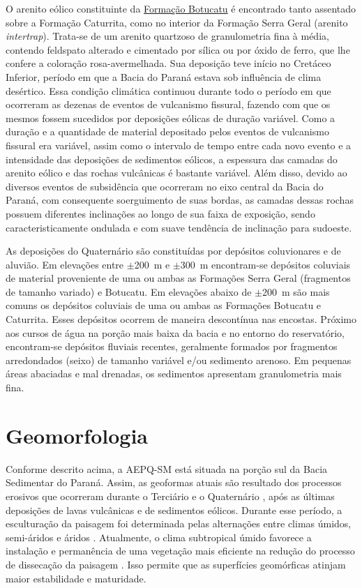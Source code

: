 O arenito eólico constituinte da \href{http://pt.wikipedia.org/wiki/Forma\%C3\%A7\%C3\%A3o_Botucatu}{Formação Botucatu} é encontrado tanto assentado sobre a Formação Caturrita, como no interior da Formação Serra Geral (arenito \textit{intertrap}). Trata-se de um arenito quartzoso de granulometria fina à média, contendo feldspato alterado e cimentado por sílica ou por óxido de ferro, que lhe confere a coloração rosa-avermelhada. Sua deposição teve início no Cretáceo Inferior, período em que a Bacia do Paraná estava sob influência de clima desértico. Essa condição climática continuou durante todo o período em que ocorreram as dezenas de eventos de vulcanismo fissural, fazendo com que os mesmos fossem sucedidos por deposições eólicas de duração variável. Como a duração e a quantidade de material depositado pelos eventos de vulcanismo fissural era variável, assim como o intervalo de tempo entre cada novo evento e a intensidade das deposições de sedimentos eólicos, a espessura das camadas do arenito eólico e das rochas vulcânicas é bastante variável. Além disso, devido ao diversos eventos de subsidência que ocorreram no eixo central da Bacia do Paraná, com consequente soerguimento de suas bordas, as camadas dessas rochas possuem diferentes inclinações ao longo de sua faixa de exposição, sendo caracteristicamente ondulada e com suave tendência de inclinação para sudoeste.

As deposições do Quaternário são constituídas por depósitos coluvionares e de aluvião. Em elevações entre $\pm$200~m e $\pm$300~m encontram-se depósitos coluviais de material proveniente de uma ou ambas as Formações Serra Geral (fragmentos de tamanho variado) e Botucatu. Em elevações abaixo de $\pm$200~m são mais comuns os depósitos coluviais de uma ou ambas as Formações Botucatu e Caturrita. Esses depósitos ocorrem de maneira descontínua nas encostas. Próximo aos cursos de água na porção mais baixa da bacia e no entorno do reservatório, encontram-se depósitos fluviais recentes, geralmente formados por fragmentos arredondados (seixo) de tamanho variável e/ou sedimento arenoso. Em pequenas áreas abaciadas e mal drenadas, os sedimentos apresentam granulometria mais fina.

\section{Geomorfologia}

Conforme descrito acima, a AEPQ-SM está situada na porção sul da Bacia Sedimentar do Paraná. Assim, as geoformas atuais são resultado dos processos erosivos que ocorreram durante o Terciário e o Quaternário \cite{Sartori2009}, após as últimas deposições de lavas vulcânicas e de sedimentos eólicos. Durante esse período, a esculturação da paisagem foi determinada pelas alternações entre climas úmidos, semi-áridos e áridos \cite{Sartori2009}. Atualmente, o clima subtropical úmido favorece a instalação e permanência de uma vegetação mais eficiente na redução do processo de dissecação da paisagem \cite{Sartori2009, NascimentoEtAl2010}. Isso permite que as superfícies geomórficas atinjam maior estabilidade e maturidade.

